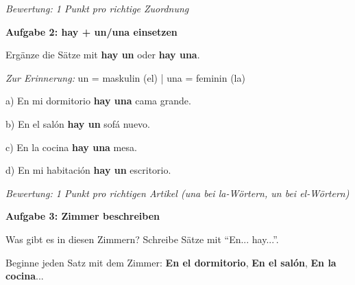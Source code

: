 \documentclass[11pt, a4paper]{article}
\newcommand{\fachfarbe}{spanisch}
\newcommand{\punktebox}[1]{\hfill\fbox{\small \_/#1}}
\newcommand{\loesung}[1]{\textcolor{loesung}{\textbf{#1}}}
\newenvironment{aufgabe}[1]{%
    \needspace{5\baselineskip}%
    \nopagebreak[4]%
    \vspace{10pt}
    \noindent\textbf{\textcolor{\fachfarbe}{Aufgabe #1}}
    \nopagebreak[4]%
    \vspace{5pt}
    \nopagebreak[4]%
    \begin{list}{}{\leftmargin=0pt}
    \item[]
}{%
    \end{list}
}
\newcommand{\es}[1]{\textcolor{\fachfarbe}{\textbf{#1}}}
\begin{document}
\textit{\textcolor{grau}{Bewertung: 1 Punkt pro richtige Zuordnung}}

\vspace{15pt}


\begin{aufgabe}{2: hay + un/una einsetzen}
Ergänze die Sätze mit \es{hay un} oder \es{hay una}. \punktebox{4}
\end{aufgabe}

\begin{vokabelkasten}
\textit{Zur Erinnerung:} un = maskulin (el) | una = feminin (la)
\end{vokabelkasten}

\vspace{0.5em}

\noindent
a) En mi dormitorio \loesung{hay una} cama grande.

\vspace{0.6em}
\noindent
b) En el salón \loesung{hay un} sofá nuevo.

\vspace{0.6em}
\noindent
c) En la cocina \loesung{hay una} mesa.

\vspace{0.6em}
\noindent
d) En mi habitación \loesung{hay un} escritorio.

\vspace{0.5em}
\textit{\textcolor{grau}{Bewertung: 1 Punkt pro richtigen Artikel (una bei la-Wörtern, un bei el-Wörtern)}}

\vspace{15pt}


\begin{aufgabe}{3: Zimmer beschreiben}
Was gibt es in diesen Zimmern? Schreibe Sätze mit ``En... hay...''. \punktebox{6}
\end{aufgabe}

\begin{hinweis}
Beginne jeden Satz mit dem Zimmer: \es{En el dormitorio}, \es{En el salón}, \es{En la cocina}...
\end{hinweis}

\vspace{0.8em}
\end{document}
